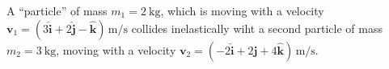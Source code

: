 \documentclass[../feynman-lectures-on-physics.tex]{subfiles}
\begin{document}
\begin{questions}
\question A ``particle'' of mass $m_1=\SI{2}{\kilo\gram}$, which is
  moving with a velocity $\mathbf{v}_1 = (3\hat{\mathbf{i}} +
  2\hat{\mathbf{j}} - \hat{\mathbf{k}})\,\si{\meter\per\second}$
  collides inelastically wiht a second particle of mass
  $m_2=\SI{3}{\kilo\gram}$, moving with a velocity
  $\mathbf{v}_2=(-2\hat{\mathbf{i}} + 2\hat{\mathbf{j}} +
  4\hat{\mathbf{k}})\,\si{\meter\per\second}$.

\end{questions}
\end{document}
